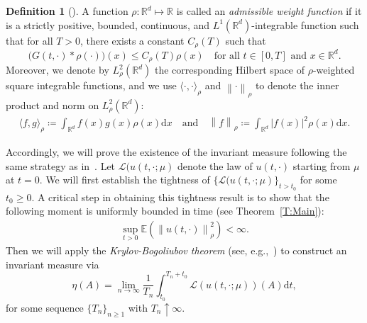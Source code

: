 \documentclass[a4paper,11pt]{article}%
\theoremstyle{plain}
\theoremstyle{definition}
\newtheorem{definition}[theorem]{Definition}
\numberwithin{equation}{section}
\newcommand{\R}{\mathbb{R}}
\newcommand{\E}{\mathbb{E}}
\newcommand{\Norm}[1]{\left\| #1 \right\|}
\newcommand{\ud}{\ensuremath{\mathrm{d}}}
\begin{document}
\begin{definition}[\cite{tessitore.zabczyk:98:invariant}]\label{D:Rho}
  A function $\rho:\R^d\mapsto \R$ is called an \textit{admissible weight function} if it is a
  strictly positive, bounded, continuous, and $L^1 (\R^d)$-integrable function such that for all
  $T>0$, there exists a constant $C_\rho(T)$ such that
  \begin{equation}\label{E:aw}
    \big(G(t,\cdot)*\rho(\cdot)\big)(x) \le C_\rho(T) \rho(x)
    \quad \text{for all $t\in[0,T]$ and $x\in\R^d$.}
  \end{equation}
  Moreover, we denote by $L^2_{\rho}(\R^d)$ the corresponding Hilbert space of $\rho$-weighted
  square integrable functions, and we use $\langle \cdot, \cdot \rangle_{\rho}$ and
  $\Norm{\cdot}_{\rho}$ to denote the inner product and norm on $L^2_{\rho}(\R^d)$:
  \begin{align*}
  		\langle f,g \rangle_{\rho} \coloneqq \int_{\R^d} f(x) g(x) \rho(x) \ud x \quad \text{and} \quad
      \Norm{f}_{\rho} \coloneqq \int_{\R^d} |f(x)|^2 \rho(x) \ud x.
  \end{align*}
\end{definition}

Accordingly, we will prove the existence of the invariant measure following the same strategy as
in~\cite{tessitore.zabczyk:98:invariant}. Let $\mathscr{L}(u(t,\cdot;\mu)$ denote the law of
$u(t,\cdot)$ starting from $\mu$ at $t = 0$. We will first establish the tightness of
$\{\mathscr{L}(u(t,\cdot;\mu)\}_{t>t_0}$ for some $ t_0\ge 0$. A critical step in obtaining this
tightness result is to show that the following moment is uniformly bounded in time (see
Theorem~\ref{T:Main}):
\begin{align}\label{E:BddMnt}
  \sup_{t>0} \E\left(\Norm{u(t,\cdot)}_{\rho}^2\right) <\infty.
\end{align}
Then we will apply the \textit{Krylov-Bogoliubov theorem} (see,
e.g.,~\cite[Theorem~11.7]{da-prato.zabczyk:14:stochastic}) to construct an invariant measure via
\begin{equation}\label{E:InvMeasForm}
  \eta(A) = \lim_{n \to \infty} \frac{1}{T_n} \int_{t_0}^{T_n + t_0} \mathscr{L}(u(t,\cdot; \mu))(A) \ud t,
\end{equation}
for some sequence $\{T_n\}_{n\ge 1}$ with $T_n\uparrow \infty$. \medskip
\end{document}
